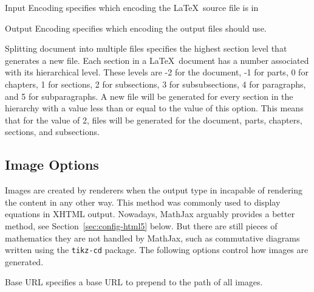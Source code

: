 \begin{configuration}{Input Encoding}
specifies which encoding the \LaTeX\ source file is in
\end{configuration}

\begin{configuration}{Output Encoding}
specifies which encoding the output files should use.
\end{configuration}

\begin{configuration}{Splitting document into multiple files}
specifies the highest section level that generates a new file.  Each section
in a \LaTeX\ document has a number associated with its hierarchical level.
These levels are -2 for the document, -1 for parts, 0 for chapters,
1 for sections, 2 for subsections, 3 for subsubsections, 4 for paragraphs,
and 5 for subparagraphs.  A new file will be generated for every section
in the hierarchy with a value less than or equal to the value of this
option.  This means that for the value of 2, files will be generated for
the document, parts, chapters, sections, and subsections.
\end{configuration}


\subsection{Image Options\label{sec:config-images}}

Images are created by renderers when the output type in incapable of
rendering the content in any other way. This method was commonly used
to display equations in XHTML output. Nowadays, MathJax arguably
provides a better method, see Section~\ref{sec:config-html5} below.
But there are still pieces of mathematics they are not handled by MathJax, such
as commutative diagrams written using the \verb+tikz-cd+ package.
The following options control how images are generated.

\begin{configuration}{Base URL}
specifies a base URL to prepend to the path of all images.
\end{configuration}

